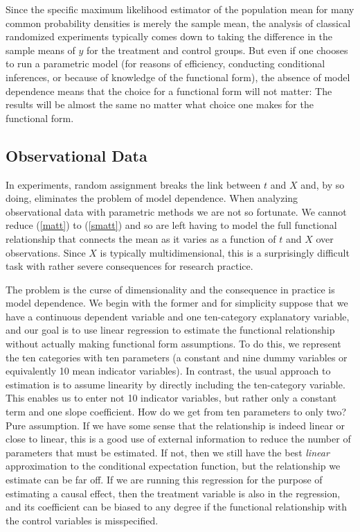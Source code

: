 \documentclass[11pt,titlepage]{article}
\begin{document}
Since the specific maximum likelihood estimator of the population mean
for many common probability densities is merely the sample mean, the
analysis of classical randomized experiments typically comes down to
taking the difference in the sample means of $y$ for the treatment and
control groups.  But even if one chooses to run a parametric model
(for reasons of efficiency, conducting conditional inferences, or
because of knowledge of the functional form), the absence of model
dependence means that the choice for a functional form will not
matter: The results will be almost the same no matter what choice one
makes for the functional form.

\subsection{Observational Data} \label{s:paraobs}

In experiments, random assignment breaks the link between $t$ and $X$
and, by so doing, eliminates the problem of model dependence.  When
analyzing observational data with parametric methods we are not so
fortunate.  We cannot reduce (\ref{matt}) to (\ref{smatt}) and so are
left having to model the full functional relationship that connects
the mean as it varies as a function of $t$ and $X$ over observations.
Since $X$ is typically multidimensional, this is a surprisingly
difficult task with rather severe consequences for research practice.

The problem is the curse of dimensionality and the consequence in
practice is model dependence.  We begin with the former and for
simplicity suppose that we have a continuous dependent variable and
one ten-category explanatory variable, and our goal is to use linear
regression to estimate the functional relationship without actually
making functional form assumptions.  To do this, we represent the ten
categories with ten parameters (a constant and nine dummy variables or
equivalently 10 mean indicator variables).  In contrast, the usual
approach to estimation is to assume linearity by directly including
the ten-category variable.  This enables us to enter not 10 indicator
variables, but rather only a constant term and one slope coefficient.
How do we get from ten parameters to only two?  Pure assumption.  If
we have some sense that the relationship is indeed linear or close to
linear, this is a good use of external information to reduce the
number of parameters that must be estimated.  If not, then we still
have the best {\it linear} approximation to the conditional
expectation function, but the relationship we estimate can be far off.
If we are running this regression for the purpose of estimating a
causal effect, then the treatment variable is also in the regression,
and its coefficient can be biased to any degree if the functional
relationship with the control variables is misspecified.
\end{document}
